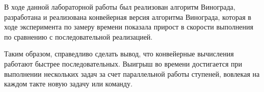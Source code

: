 \Conclusion

В ходе данной лабораторной работы был реализован алгоритм Винограда, разработана и реализована конвейерная версия алгоритма Винограда, которая в ходе эксперимента по замеру времени показала прирост в скорости выполнения по сравнению с последовательной реализацией.

Таким образом, справедливо сделать вывод, что конвейерные вычисления работают быстрее последовательных. Выигрыш во времени достигается при выполнении нескольких задач за счет параллельной работы ступеней, вовлекая на каждом такте новую задачу или команду.


